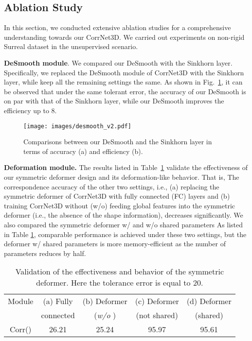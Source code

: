 \documentclass[final]{cvpr}
\begin{document}
 
\subsection{Ablation Study}\label{ablation_}
In this section, we conducted extensive ablation studies for a comprehensive understanding towards our CorrNet3D. We carried out experiments on non-rigid Surreal dataset in the unsupervised scenario. 

\textbf{DeSmooth module}. We compared our DeSmooth with the Sinkhorn layer. Specifically, we replaced the DeSmooth module of CorrNet3D with the Sinkhorn layer, while keep all the remaining settings the same. As shown in Fig.~\ref{sinkhorn2}, it can be observed that 
under the same tolerant error, the accuracy of our DeSmooth is on par with that of the Sinkhorn layer, while our DeSmooth improves the efficiency up to 8.






\begin{figure}[t]
  \centering
  \texttt{[image: images/desmooth\_v2.pdf]}
  \caption{Comparisons between our DeSmooth and the Sinkhorn layer in terms of accuracy (a) and efficiency (b).}
  \label{sinkhorn2}
 \end{figure}

\textbf{Deformation module.} The results listed in  Table~\ref{table:decoder} validate the effectiveness of our symmetric deformer design and its deformation-like behavior. That is, The correspondence accuracy of the other two settings, i.e., (a) replacing the symmetric deformer of CorrNet3D with fully connected (FC) layers and (b) training CorrNet3D without (w/o) feeding global features into the symmetric deformer (i.e., the absence of the shape information),  decreases significantly.
We also compared the symmetric deformer w/ and w/o shared parameters As listed in Table \ref{table:decoder}, comparable performance is achieved under these two settings, but the deformer w/ shared parameters is more memory-efficient as the number of parameters reduces by half.


\begin{table}[t]
  \centering
  \caption{Validation of the effectiveness and behavior of the symmetric deformer.
Here the tolerance error is equal to 20.}
  \label{table:decoder}
  \footnotesize
  \begin{tabular}{c||c|c|c|c}
\toprule[1.5pt]
  Module & (a) Fully & (b) Deformer & (c) Deformer  & (d) Deformer   \\ 
        &  connected  & (\textit{w/o} ) &  (not shared)  & (shared) \\ \hline
Corr()    & 26.21        &  25.24    & 95.97                    & 95.61               \\\bottomrule[1.5pt]
\end{tabular}
  \end{table}
\end{document}
